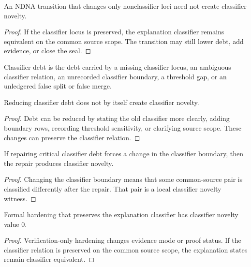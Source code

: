 \begin{theorem}
\label{thm:philosophy-ndna-nonclassifier-change-no-novelty}
An NDNA transition that changes only nonclassifier loci need not create
classifier novelty.
\end{theorem}
\begin{proof}
If the classifier locus is preserved, the explanation classifier remains
equivalent on the common source scope. The transition may still lower
debt, add evidence, or close the seal.
\end{proof}

\begin{definition}
\label{def:philosophy-classifier-debt}
Classifier debt is the debt carried by a missing classifier locus, an
ambiguous classifier relation, an unrecorded classifier boundary, a
threshold gap, or an unledgered false split or false merge.
\end{definition}

\begin{theorem}
\label{thm:philosophy-classifier-debt-reduction-no-novelty}
Reducing classifier debt does not by itself create classifier novelty.
\end{theorem}
\begin{proof}
Debt can be reduced by stating the old classifier more clearly, adding
boundary rows, recording threshold sensitivity, or clarifying source
scope. These changes can preserve the classifier relation.
\end{proof}

\begin{theorem}
\label{thm:philosophy-critical-classifier-debt-can-force-novelty}
If repairing critical classifier debt forces a change in the classifier
boundary, then the repair produces classifier novelty.
\end{theorem}
\begin{proof}
Changing the classifier boundary means that some common-source pair is
classified differently after the repair. That pair is a local classifier
novelty witness.
\end{proof}

\begin{theorem}
\label{thm:philosophy-verification-only-hardening-no-classifier-novelty}
Formal hardening that preserves the explanation classifier has classifier
novelty value $0$.
\end{theorem}
\begin{proof}
Verification-only hardening changes evidence mode or proof status. If the
classifier relation is preserved on the common source scope, the
explanation states remain classifier-equivalent.
\end{proof}

